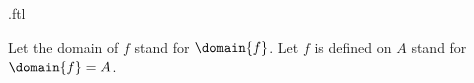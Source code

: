 \documentclass{article}
\begin{document}
\begin{smodule}[creators={Marcel Schütz}]{.ftl}
  \begin{fconvention*}
    Let the domain of $f$ stand for $\domain{f}$.
    Let $f$ is defined on $A$ stand for $\domain{f} = A$.
  \end{fconvention*}
\end{smodule}
\end{document}
